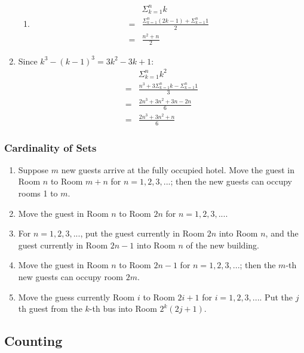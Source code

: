 \documentclass{../../cls/sig-alternate-05-2015}
\begin{document}
\begin{enumerate}
\begin{enumerate}
	\item 
	\begin{align}
		& \Sigma^n_{k = 1} k\\
		= & \frac{\Sigma^n_{k = 1}(2k - 1) + \Sigma^n_{k = 1} 1}{2}\\
		= & \frac{n^2 + n}{2}
	\end{align}
\end{enumerate}

\item Since $k^3 - (k - 1)^3 = 3k^2 - 3k + 1$:
\begin{align}
	& \Sigma_{k = 1}^n k^2\\
	= & \frac{n^3 + 3\Sigma_{k = 1}^n k - \Sigma_{k = 1}^n 1}{3}\\
	= & \frac{2n^3 + 3n^2 + 3n - 2n}{6}\\
	= & \frac{2n^3 + 3n^2 + n}{6}
\end{align}
\end{enumerate}
\subsubsection{Cardinality of Sets}
\begin{enumerate}
\item Suppose $m$
new guests arrive at the fully occupied hotel. Move the guest
in Room $n$ to Room $m + n$ for $n = 1, 2, 3, ...$; then the new
guests can occupy rooms 1 to $m$.
\item Move the guest
in Room $n$ to Room $2n$ for $n = 1, 2, 3, ...$.
\item For $n = 1, 2, 3, ...$, put the guest currently in Room $2n$ into Room $n$, and the guest
currently in Room $2n - 1$ into Room $n$ of the new building.
\item Move the guest
in Room $n$ to Room $2n - 1$ for $n = 1, 2, 3, ...$; then the $m$-th new guests can occupy room $2m$.
\item Move the guess currently Room $i$ to Room $2i + 1$ for $i = 1, 2, 3, ...$. Put the $j$ th guest from the $k$-th bus into
Room $2^k(2j + 1)$.
\end{enumerate}

\subsection{Counting}
\end{document}
